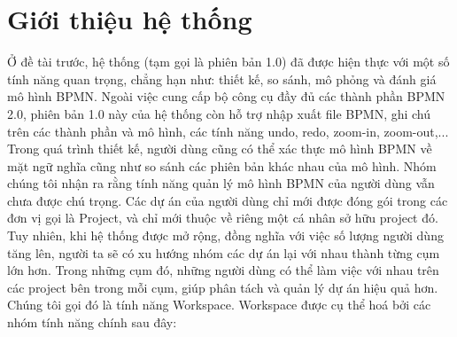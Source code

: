 \section{Giới thiệu hệ thống}
Ở đề tài trước, hệ thống (tạm gọi là phiên bản 1.0) đã được hiện thực với một số tính năng quan trọng, chẳng hạn như: thiết kế, so sánh, mô phỏng và đánh giá mô hình BPMN. Ngoài việc cung cấp bộ công cụ đầy đủ các thành phần BPMN 2.0, phiên bản 1.0 này của hệ thống còn hỗ trợ nhập xuất file BPMN, ghi chú trên các thành phần và mô hình, các tính năng undo, redo, zoom-in, zoom-out,... Trong quá trình thiết kế, người dùng cũng có thể xác thực mô hình BPMN về mặt ngữ nghĩa cũng như so sánh các phiên bản khác nhau của mô hình.
\newline
Nhóm chúng tôi nhận ra rằng tính năng quản lý mô hình BPMN của người dùng vẫn chưa được chú trọng. Các dự án của người dùng chỉ mới được đóng gói trong các đơn vị gọi là Project, và chỉ mới thuộc về riêng một cá nhân sở hữu project đó. Tuy nhiên, khi hệ thống được mở rộng, đồng nghĩa với việc số lượng người dùng tăng lên, người ta sẽ có xu hướng nhóm các dự án lại với nhau thành từng cụm lớn hơn. Trong những cụm đó, những người dùng có thể làm việc với nhau trên các project bên trong mỗi cụm, giúp phân tách và quản lý dự án hiệu quả hơn. Chúng tôi gọi đó là tính năng Workspace.
\newline
Workspace được cụ thể hoá bởi các nhóm tính năng chính sau đây:
